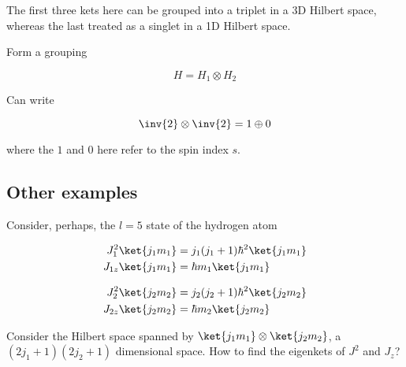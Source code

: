 The first three kets here can be grouped into a triplet in a 3D Hilbert space, whereas the last treated as a singlet in a 1D Hilbert space.

Form a grouping

\begin{equation}\label{eqn:qmTwoL16:550}
H = H_1 \otimes H_2
\end{equation}

Can write

\begin{equation}\label{eqn:qmTwoL16:570}
\inv{2} \otimes \inv{2} = 1 \oplus 0
\end{equation}

where the $1$ and $0$ here refer to the spin index $s$.

\subsection{Other examples}

Consider, perhaps, the $l=5$ state of the hydrogen atom

\begin{align}\label{eqn:qmTwoL16:590}
J_1^2 \ket{j_1 m_1} &= j_1(j_1+1)\hbar^2 \ket{j_1 m_1} \\
J_{1z} \ket{j_1 m_1} &= \hbar m_1 \ket{j_1 m_1} 
\end{align}

\begin{align}\label{eqn:qmTwoL16:610}
J_2^2 \ket{j_2 m_2} &= j_2(j_2+1)\hbar^2 \ket{j_2 m_2} \\
J_{2z} \ket{j_2 m_2} &= \hbar m_2 \ket{j_2 m_2} 
\end{align}

Consider the Hilbert space spanned by $\ket{j_1 m_1} \otimes \ket{j_2 m_2}$, a $(2 j_1 + 1)(2 j_2 + 1)$ dimensional space.  How to find the eigenkets of $J^2$ and $J_z$?


